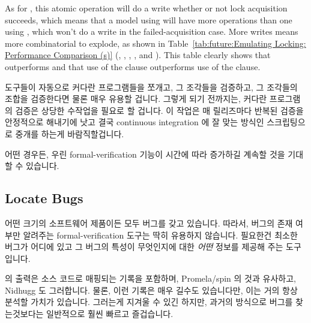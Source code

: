{	As for , this atomic operation will do a
	write whether or not lock acquisition succeeds, which means
	that a model using  will have more operations
	than one using , which won't do a write
	in the failed-acquisition case.
	More writes means more combinatorial to explode, as shown in
	Table~\ref{tab:future:Emulating Locking: Performance Comparison (s)}
	(,
	,
	,
	, and
	).
	This table clearly shows that 
	outperforms  and that use of the
	 clause outperforms use of the  clause.
	\fi
} \QuickQuizEnd

도구들이 자동으로 커다란 프로그램들을 쪼개고, 그 조각들을 검증하고, 그 조각들의
조합을 검증한다면 물론 매우 유용할 겁니다.
그렇게 되기 전까지는, 커다란 프로그램의 검증은 상당한 수작업을 필요로 할
겁니다.
이 작업은 매 릴리즈마다 반복된 검증을 안정적으로 해내기에 낫고 결국 continuous
integration 에 잘 맞는 방식인 스크립팅으로 중개를 하는게 바람직할겁니다.

어떤 경우든, 우린 formal-verification 기능이 시간에 따라 증가하길 계속할 것을
기대할 수 있습니다.
\iffalse

It would of course be quite useful for tools to automatically divide
up large programs, verify the pieces, and then verify the combinations
of pieces.
In the meantime, verification of large programs will require significant
manual intervention.
This intervention will preferably mediated by scripting, the better to
reliably carry out repeated verifications on each release, and
preferably eventually in a manner well-suited for continuous integration.

In any case, we can expect formal-verification capabilities to continue
to increase over time.
\fi

\subsection{Locate Bugs}
\label{sec:future:Locate Bugs}

어떤 크기의 소프트웨어 제품이든 모두 버그를 갖고 있습니다.
따라서, 버그의 존재 여부만 알려주는 formal-verification 도구는 딱히 유용하지
않습니다.
필요한건 최소한 버그가 어디에 있고 그 버그의 특성이 무엇인지에 대한 \emph{어떤}
정보를 제공해 주는 도구입니다.

 의 출력은 소스 코드로 매핑되는 기록을 포함하며, Promela/spin 의 것과
유사하고, Nidhugg 도 그러합니다.
물론, 이런 기록은 매우 길수도 있습니다만, 이는 거의 항상 분석할 가치가
있습니다.
그러는게 지겨울 수 있긴 하지만, 과거의 방식으로 버그를 찾는것보다는 일반적으로
훨씬 빠르고 즐겁습니다.
\iffalse

